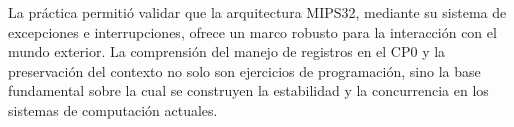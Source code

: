\documentclass[]{article}
\begin{document}
	La práctica permitió validar que la arquitectura MIPS32, mediante su sistema de excepciones e interrupciones, ofrece un marco robusto para la interacción con el mundo exterior. La comprensión del manejo de registros en el CP0 y la preservación del contexto no solo son ejercicios de programación, sino la base fundamental sobre la cual se construyen la estabilidad y la concurrencia en los sistemas de computación actuales.
\end{document}
